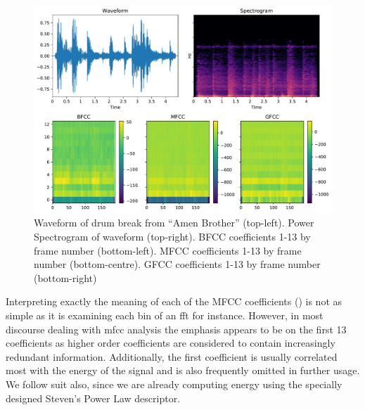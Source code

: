 {{\begin{figure}
	\begin{center}
		\includegraphics[scale=0.75]{ch05_pyconcat/figures/wave_spec_mfcc_bfcc.pdf}		
		\end{center}
		\caption[Waveform, Spectrogram, BFCC, MFCC and GFCC impressions of the ``Amen Break'' drum solo from ``Amen Brother'']{Waveform of drum break from ``Amen Brother'' (top-left). Power Spectrogram of waveform (top-right). BFCC coefficients 1-13 by frame number (bottom-left). MFCC coefficients 1-13 by frame number (bottom-centre). GFCC coefficients 1-13 by frame number (bottom-right)}
	\label{fig:bfcc_mfcc_gfcc_compared}
\end{figure}



Interpreting exactly the meaning of each of the MFCC coefficients () is not as simple as it is examining each bin of an \acrshort{fft} for instance. However, in most discourse dealing with \acrshort{mfcc} analysis the emphasis appears to be on the first 13 coefficients as higher order coefficients are considered to contain increasingly redundant information. Additionally, the first coefficient is usually correlated most with the energy of the signal and is also frequently omitted in further usage.  We follow suit also, since we are already computing energy using the specially designed Steven's Power Law descriptor.

}}
